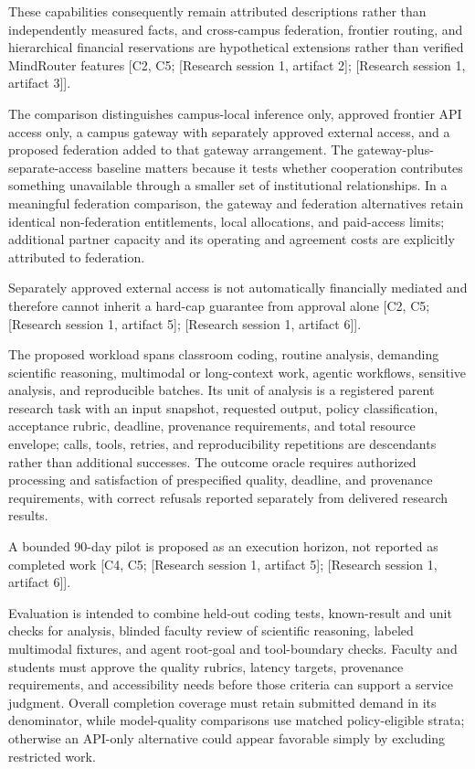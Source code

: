 \documentclass[11pt]{article}
\begin{document}
These capabilities consequently remain attributed descriptions rather than independently measured facts, and cross-campus federation, frontier routing, and hierarchical financial reservations are hypothetical extensions rather than verified MindRouter features [C2, C5; [Research session 1, artifact 2]; [Research session 1, artifact 3]].

The comparison distinguishes campus-local inference only, approved frontier API access only, a campus gateway with separately approved external access, and a proposed federation added to that gateway arrangement. The gateway-plus-separate-access baseline matters because it tests whether cooperation contributes something unavailable through a smaller set of institutional relationships. In a meaningful federation comparison, the gateway and federation alternatives retain identical non-federation entitlements, local allocations, and paid-access limits; additional partner capacity and its operating and agreement costs are explicitly attributed to federation.

Separately approved external access is not automatically financially mediated and therefore cannot inherit a hard-cap guarantee from approval alone [C2, C5; [Research session 1, artifact 5]; [Research session 1, artifact 6]].

The proposed workload spans classroom coding, routine analysis, demanding scientific reasoning, multimodal or long-context work, agentic workflows, sensitive analysis, and reproducible batches. Its unit of analysis is a registered parent research task with an input snapshot, requested output, policy classification, acceptance rubric, deadline, provenance requirements, and total resource envelope; calls, tools, retries, and reproducibility repetitions are descendants rather than additional successes. The outcome oracle requires authorized processing and satisfaction of prespecified quality, deadline, and provenance requirements, with correct refusals reported separately from delivered research results.

A bounded 90-day pilot is proposed as an execution horizon, not reported as completed work [C4, C5; [Research session 1, artifact 5]; [Research session 1, artifact 6]].

Evaluation is intended to combine held-out coding tests, known-result and unit checks for analysis, blinded faculty review of scientific reasoning, labeled multimodal fixtures, and agent root-goal and tool-boundary checks. Faculty and students must approve the quality rubrics, latency targets, provenance requirements, and accessibility needs before those criteria can support a service judgment. Overall completion coverage must retain submitted demand in its denominator, while model-quality comparisons use matched policy-eligible strata; otherwise an API-only alternative could appear favorable simply by excluding restricted work.
\end{document}
